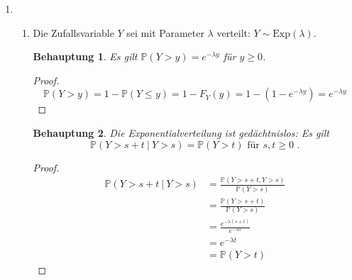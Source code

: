 \documentclass[a4paper]{scrartcl}
\newtheorem*{behaupt}{Behauptung}
\newcommand{\prob}{\mathbb{P}}
\def \blattnr {4}
\begin{document}
\begin{enumerate}[label=\bfseries \blattnr.\arabic*]
\begin{enumerate}
        \end{enumerate}

    \item 
        \begin{enumerate}
            \item
                Die Zufallsvariable $Y$ sei mit Parameter $\lambda$ verteilt:
                $Y \sim \text{Exp}(\lambda)$.
                \begin{behaupt}
                    Es gilt $\prob(Y > y) = e^{-\lambda y}$ für $y \geq 0$.
                \end{behaupt}
                \begin{proof}
                    \begin{equation*}
                        \prob(Y > y)
                        = 1 - \prob(Y \leq y)
                        = 1 - F_Y(y)
                        = 1 - (1 - e^{-\lambda y})
                        = e^{-\lambda y}
                    \end{equation*}
                \end{proof}

                \begin{behaupt}
                    Die Exponentialverteilung ist gedächtnislos:
                    Es gilt
                    \begin{equation*}
                        \prob(Y > s + t\ |\ Y > s) = \prob(Y > t)
                        \text{ für }
                        s,t \geq 0
                        \text{ .}
                    \end{equation*}
                \end{behaupt}
                \begin{proof}
                    \begin{equation*}
                        \begin{split}
                            \prob(Y > s + t\ |\ Y > s)
                            &= \frac{\prob(Y > s+t, Y > s)}{\prob(Y > s)} \\
                            &= \frac{\prob(Y > s+t)}{\prob(Y > s)} \\
                            &= \frac{e^{-\lambda (s+t)}}{e^{-\lambda s}} \\
                            &= e^{-\lambda t} \\
                            &= \prob(Y > t)
                        \end{split}
                    \end{equation*}
                \end{proof}


\end{enumerate}
\end{enumerate}
\end{document}

